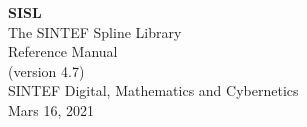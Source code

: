 \documentclass[a4paper]{report}
\begin{document}
\begin{titlepage}
  \vspace{5 cm}
  \begin{center}
  \Huge
  \textbf{SISL} \\
  \huge
  The SINTEF Spline Library \\ 
  \LARGE
  Reference Manual \\
  (version 4.7)\\ 
  \vspace{10 mm}
  \large
  SINTEF Digital, Mathematics and Cybernetics \\
  Mars 16, 2021
  \end{center}

\end{titlepage}

\tableofcontents
\cleardoublepage
{}
\setcounter{page}{1}


\cleardoublepage

\cleardoublepage

\cleardoublepage

\cleardoublepage

\cleardoublepage

\cleardoublepage

\cleardoublepage

\cleardoublepage

\cleardoublepage

\cleardoublepage


\cleardoublepage

\cleardoublepage

\cleardoublepage
\printindex
\end{document}

